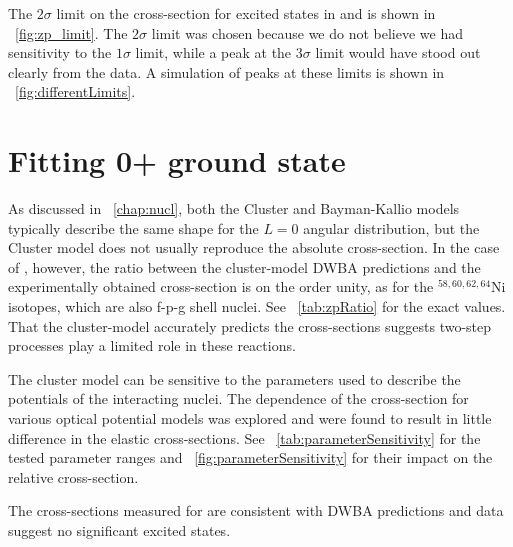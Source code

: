 The $2\sigma$ limit on the cross-section for excited \zp states in  and  is shown in {\fig}~\ref{fig:zp_limit}.  The $2\sigma$ limit was chosen because we do not believe we had sensitivity to the $1\sigma$ limit, while a peak at the $3\sigma$ limit would have stood out clearly from the data.  A simulation of peaks at these limits is shown in {\fig}~\ref{fig:differentLimits}.

\section{Fitting 0+ ground state}

As discussed in {\chap}~\ref{chap:nucl}, both the Cluster and Bayman-Kallio models typically describe the same shape for the $L=0$ angular distribution, but the Cluster model does not usually reproduce the absolute cross-section.  In the case of \GeTargets, however, the ratio between the cluster-model DWBA predictions and the experimentally obtained cross-section is on the order unity, as for the $^{58,60,62,64}$Ni isotopes, which are also f-p-g shell nuclei.  See {\tab}~\ref{tab:zpRatio} for the exact values.  That the cluster-model accurately predicts the \reaction cross-sections suggests two-step processes play a limited role in these reactions.

The cluster model can be sensitive to the parameters used to describe the potentials of the interacting nuclei.  The dependence of the cross-section for various  optical potential models was explored and were found to result in little difference in the elastic cross-sections.  See {\tab}~\ref{tab:parameterSensitivity} for the tested parameter ranges and {\fig}~\ref{fig:parameterSensitivity} for their impact on the relative cross-section.

The cross-sections measured for \reaction are consistent with DWBA predictions and data suggest no significant excited \zp states.
%
% 
% 
